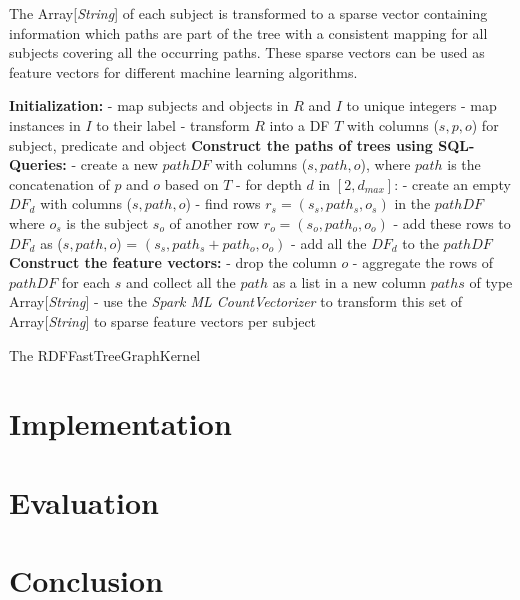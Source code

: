\documentclass{easychair}
\begin{document}
The Array[\textit{String}] of each subject is transformed to a sparse vector containing information which paths are part of the tree with a consistent mapping for all subjects covering all the occurring paths. These sparse vectors can be used as feature vectors for different machine learning algorithms. 

\begin{algorithm}
 \label{alg:FTGK}
 \;
 \textbf{Initialization:}\; \Indp
 - map subjects and objects in $R$ and $I$ to unique integers\;
 - map instances in $I$ to their label\;
 - transform $R$ into a DF $T$ with columns ($s,p,o$) for subject, predicate and object\; \Indm
\; 
\textbf{Construct the paths of trees using SQL-Queries:}\; \Indp
- create a new $pathDF$ with columns ($s,path,o$), where $path$ is the concatenation of $p$ and $o$ based on $T$\;
- for depth $d$ in $[2,d_{max}]$:\; \Indp
- create an empty $DF_d$ with columns ($s,path,o$)\;
- find rows $r_s = (s_s,path_s,o_s)$ in the $pathDF$ where $o_s$ is the subject $s_o$ of another row $r_o=(s_o,path_o,o_o)$\;
- add these rows to $DF_d$ as ($s,path,o$) = $(s_s,path_s+path_o,o_o)$\; \Indm
- add all the $DF_d$ to the $pathDF$\; \Indm
 \;
 \textbf{Construct the feature vectors:}\; \Indp
 - drop the column $o$\;
 - aggregate the rows of $pathDF$ for each $s$ and collect all the $path$ as a list in a new column $paths$ of type Array[\textit{String}]\;
 - use the \textit{Spark ML CountVectorizer} to transform this set of Array[\textit{String}] to sparse feature vectors per subject\;
 \;
\caption{The RDFFastTreeGraphKernel}
\end{algorithm}

\section{Implementation}
\label{sect:Implementation}


\section{Evaluation}
\label{sect:Evaluation}


\section{Conclusion}
\label{sect:Conclusion}
\end{document}
